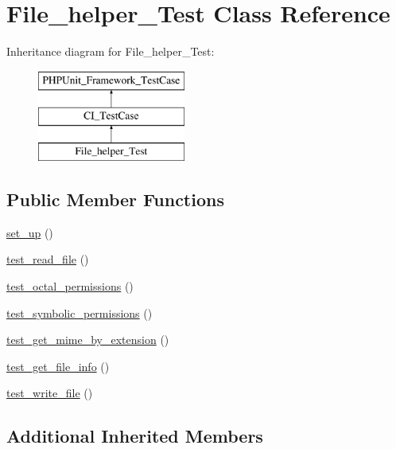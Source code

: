 \hypertarget{class_file__helper___test}{}\section{File\+\_\+helper\+\_\+\+Test Class Reference}
\label{class_file__helper___test}
Inheritance diagram for File\+\_\+helper\+\_\+\+Test\+:\begin{figure}[H]
\begin{center}
\leavevmode
\includegraphics[height=3.000000cm]{class_file__helper___test}
\end{center}
\end{figure}
\subsection*{Public Member Functions}
\begin{DoxyCompactItemize}
\item 
\hyperlink{class_file__helper___test_a69829875c8d4b6ce94908445c4155741}{set\+\_\+up} ()
\item 
\hyperlink{class_file__helper___test_ab2f20e23767e5a025e496d4eee8ad837}{test\+\_\+read\+\_\+file} ()
\item 
\hyperlink{class_file__helper___test_acabb6a16bf46c75bad1ff31099a4de48}{test\+\_\+octal\+\_\+permissions} ()
\item 
\hyperlink{class_file__helper___test_a0d614598463850298c8f555b1d2234b2}{test\+\_\+symbolic\+\_\+permissions} ()
\item 
\hyperlink{class_file__helper___test_a1b848de2bee08f53d199ec6e7b257ec5}{test\+\_\+get\+\_\+mime\+\_\+by\+\_\+extension} ()
\item 
\hyperlink{class_file__helper___test_a4edf6ba95346be07e9055dfe02591d19}{test\+\_\+get\+\_\+file\+\_\+info} ()
\item 
\hyperlink{class_file__helper___test_ab2a4569634f706be4d4b1e5f2d607e41}{test\+\_\+write\+\_\+file} ()
\end{DoxyCompactItemize}
\subsection*{Additional Inherited Members}


